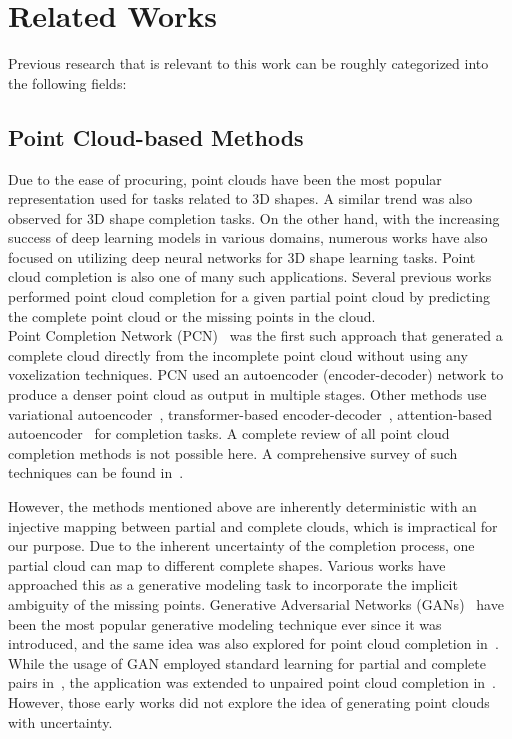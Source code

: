 \chapter{Related Works}\label{ch:related-work}
Previous research that is relevant to this work can be roughly categorized into the following fields:



\section{Point Cloud-based Methods}\label{PCC-old}
Due to the ease of procuring, point clouds have been the most popular representation used for tasks related to 3D shapes. A similar trend was also observed for 3D shape completion tasks. On the other hand, with the increasing success of deep learning models in various domains, numerous works have also focused on utilizing deep neural networks for 3D shape learning tasks. Point cloud completion is also one of many such applications. Several previous works~\cite{PCN, PoinTr, PointAttN, VarPCN, PCNSkip, Snowflake} performed point cloud completion for a given partial point cloud by predicting the complete point cloud or the missing points in the cloud. 
\\
Point Completion Network (PCN)~\cite{PCN} was the first such approach that generated a complete cloud directly from the incomplete point cloud without using any voxelization techniques. PCN used an autoencoder (encoder-decoder) network to produce a denser point cloud as output in multiple stages. Other methods use variational autoencoder~\cite{VarPCN}, transformer-based encoder-decoder~\cite{PoinTr, Snowflake}, attention-based autoencoder~\cite{PointAttN, VarPCN, PCNSkip} for completion tasks. A complete review of all point cloud completion methods is not possible here. A comprehensive survey of such techniques can be found in~\cite{PCNSurvey}. 
\newline

However, the methods mentioned above are inherently deterministic with an injective mapping between partial and complete clouds, which is impractical for our purpose. Due to the inherent uncertainty of the completion process, one partial cloud can map to different complete shapes. Various works have approached this as a generative modeling task to incorporate the implicit ambiguity of the missing points. Generative Adversarial Networks (GANs)~\cite{GAN} have been the most popular generative modeling technique ever since it was introduced, and the same idea was also explored for point cloud completion in~\cite{GANPCC1, GANUPCC}. While the usage of GAN employed standard learning for partial and complete pairs in~\cite{GANPCC1}, the application was extended to unpaired point cloud completion in~\cite{GANUPCC}. However, those early works did not explore the idea of generating point clouds with uncertainty. 
\newline

